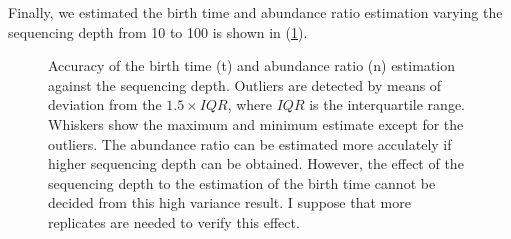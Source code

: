 \documentclass{article}
\begin{document}
Finally, we estimated the birth time and abundance ratio estimation varying the sequencing depth from 10 to 100 is shown in (\ref{fig: read_emission_snv}).

\begin{figure}[H]
   \caption{
 Accuracy of the birth time (t) and abundance ratio (n) estimation against the sequencing depth. Outliers are detected by means of deviation from the $1.5 \times IQR$, where $IQR$ is the interquartile range. Whiskers show the maximum and minimum estimate except for the outliers. The abundance ratio can be estimated more acculately if higher sequencing depth can be obtained.
 However, the effect of the sequencing depth to the estimation of the birth time cannot be decided from this high variance result. I suppose that more replicates are needed to verify this effect.
  }
 \label{fig: read_emission_snv}
\end{figure}
\end{document}
